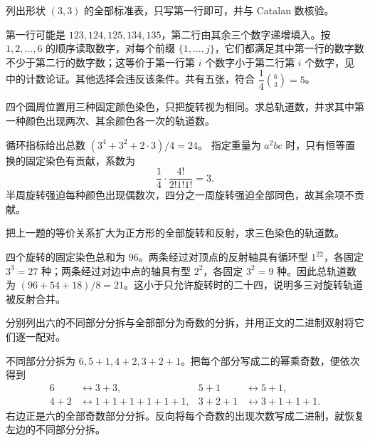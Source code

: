\begin{exercise}\label{b5:ex:A-catalan-five}
	列出形状 \((3,3)\) 的全部标准表，只写第一行即可，并与 Catalan 数核验。
\end{exercise}
\begin{solution}
	第一行可能是 \(123,124,125,134,135\)，第二行由其余三个数字递增填入。按 \(1,2,\ldots,6\) 的顺序读取数字，对每个前缀 \(\{1,\ldots,j\}\)，它们都满足其中第一行的数字数不少于第二行的数字数；这等价于第一行第 \(i\) 个数字小于第二行第 \(i\) 个数字，见中的计数论证。其他选择会违反该条件。共有五张，符合 \(\dfrac14\binom63=5\)。
\end{solution}

\begin{exercise}\label{b5:ex:A-necklace-three-colors}
	四个圆周位置用三种固定颜色染色，只把旋转视为相同。求总轨道数，并求其中第一种颜色出现两次、其余颜色各一次的轨道数。
\end{exercise}
\begin{solution}
	循环指标给出总数 \((3^4+3^2+2\cdot3)/4=24\)。 指定重量为 \(a^2bc\) 时，只有恒等置换的固定染色有贡献，系数为
	\[
		\frac14\cdot\frac{4!}{2!1!1!}=3.
	\]
	半周旋转强迫每种颜色出现偶数次，四分之一周旋转强迫全部同色，故其余项不贡献。
\end{solution}

\begin{exercise}\label{b5:ex:A-bracelet-three-colors}
	把上一题的等价关系扩大为正方形的全部旋转和反射，求三色染色的轨道数。
\end{exercise}
\begin{solution}
	四个旋转的固定染色总和为 \(96\)。两条经过对顶点的反射轴具有循环型 \(1^22\)，各固定 \(3^3=27\) 种；两条经过对边中点的轴具有型 \(2^2\)，各固定 \(3^2=9\) 种。因此总轨道数为 \((96+54+18)/8=21\)。这小于只允许旋转时的二十四，说明多三对旋转轨道被反射合并。
\end{solution}

\begin{exercise}\label{b5:ex:A-partition-six}
	分别列出六的不同部分分拆与全部部分为奇数的分拆，并用正文的二进制双射将它们逐一配对。
\end{exercise}
\begin{solution}
	不同部分分拆为 \(6,5+1,4+2,3+2+1\)。把每个部分写成二的幂乘奇数，便依次得到
	\[
		\begin{aligned}
			6&\longleftrightarrow3+3,& 5+1&\longleftrightarrow5+1,\\
			4+2&\longleftrightarrow1+1+1+1+1+1,& 3+2+1&\longleftrightarrow3+1+1+1.
		\end{aligned}
	\]
	右边正是六的全部奇数部分分拆。反向将每个奇数的出现次数写成二进制，就恢复左边的不同部分分拆。
\end{solution}

